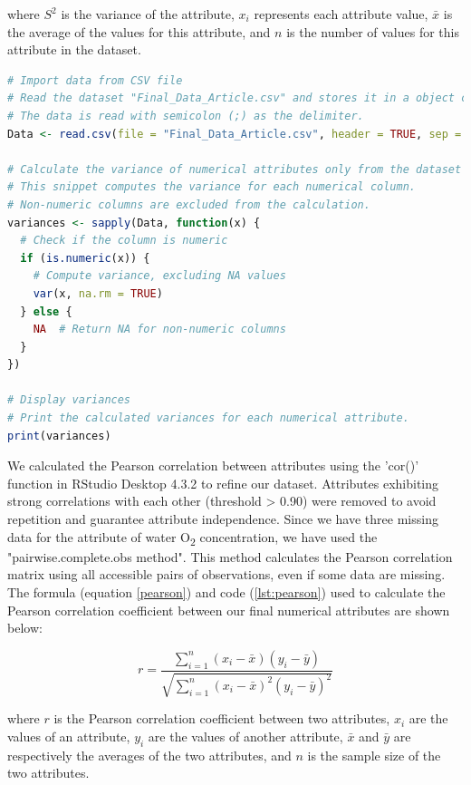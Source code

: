 where $S^2$ is the variance of the attribute, $x_i$ represents each attribute value, $\bar{x}$ is the average of the values for this attribute, and $n$ is the number of values for this attribute in the dataset.

\begin{lstlisting}[label=lst:variance,language=R,caption=RStudio script to calculate the variance of each numerical attributes in our final dataset]
# Import data from CSV file
# Read the dataset "Final_Data_Article.csv" and stores it in a object called Data.
# The data is read with semicolon (;) as the delimiter.
Data <- read.csv(file = "Final_Data_Article.csv", header = TRUE, sep = ";")

# Calculate the variance of numerical attributes only from the dataset
# This snippet computes the variance for each numerical column.
# Non-numeric columns are excluded from the calculation.
variances <- sapply(Data, function(x) {
  # Check if the column is numeric
  if (is.numeric(x)) {
    # Compute variance, excluding NA values
    var(x, na.rm = TRUE)
  } else {
    NA  # Return NA for non-numeric columns
  }
})

# Display variances
# Print the calculated variances for each numerical attribute.
print(variances)
\end{lstlisting}

We calculated the Pearson correlation between attributes using the 'cor()' function in RStudio Desktop 4.3.2 to refine our dataset. Attributes exhibiting strong correlations with each other (threshold > 0.90) were removed to avoid repetition and guarantee attribute independence. Since we have three missing data for the attribute of water O\textsubscript{2} concentration, we have used the "pairwise.complete.obs method". This method calculates the Pearson correlation matrix using all accessible pairs of observations, even if some data are missing. The formula (equation \ref{pearson}) and code (\autoref{lst:pearson}) used to calculate the Pearson correlation coefficient between our final numerical attributes are shown below:

\begin{equation}\label{pearson}
    r = \frac{\sum_{i=1}^{n} (x_i - \bar{x})(y_i - \bar{y})}{\sqrt{\sum_{i=1}^{n} (x_i - \bar{x})^2 (y_i - \bar{y})^2}}
\end{equation}

where $r$ is the Pearson correlation coefficient between two attributes, $x_i$ are the values of an attribute, $y_i$ are the values of another attribute, $\bar{x}$ and $\bar{y}$ are respectively the averages of the two attributes, and $n$ is the sample size of the two attributes.

